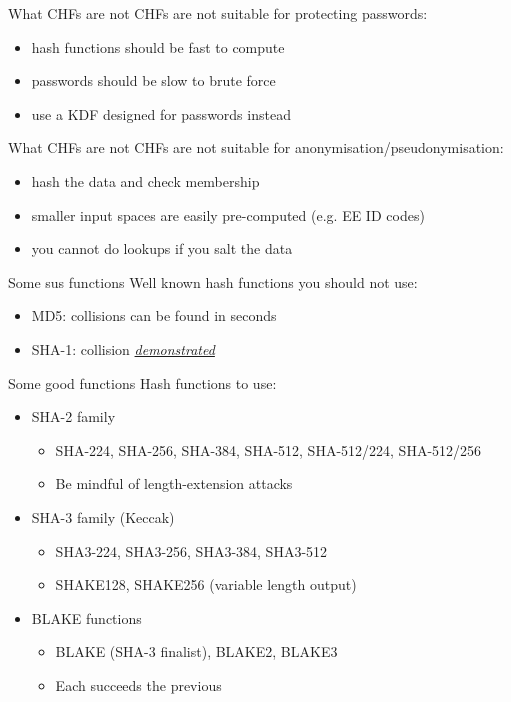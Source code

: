 \begin{frame}{What CHFs are not}
  CHFs are not suitable for protecting passwords:
  \begin{itemize}[<+(1)->]
    \item hash functions should be fast to compute
    \item passwords should be slow to brute force
    \item use a KDF designed for passwords instead
  \end{itemize}
\end{frame}

\begin{frame}{What CHFs are not}
  CHFs are not suitable for anonymisation/pseudonymisation:
  \begin{itemize}[<+(1)->]
    \item hash the data and check membership
    \item smaller input spaces are easily pre-computed (e.g. EE ID codes)
    \item you cannot do lookups if you salt the data
  \end{itemize}
\end{frame}

\begin{frame}{Some sus functions}
  Well known hash functions you should not use:
  \begin{itemize}[<+(1)->]
    \item MD5: collisions can be found in seconds
    \item SHA-1: collision \href{https://shattered.io}{\textit{demonstrated}}
  \end{itemize}
\end{frame}

\begin{frame}{Some good functions}
  Hash functions to use:
  \begin{itemize}[<+(1)->]
    \item SHA-2 family
    \begin{itemize}
      \item SHA-224, SHA-256, SHA-384, SHA-512, SHA-512/224, SHA-512/256
      \item Be mindful of length-extension attacks
    \end{itemize}
    \item SHA-3 family (Keccak)
    \begin{itemize}
      \item SHA3-224, SHA3-256, SHA3-384, SHA3-512
      \item SHAKE128, SHAKE256 (variable length output)
    \end{itemize}
    \item BLAKE functions
    \begin{itemize}
      \item BLAKE (SHA-3 finalist), BLAKE2, BLAKE3
      \item Each succeeds the previous
    \end{itemize}
  \end{itemize}
\end{frame}

